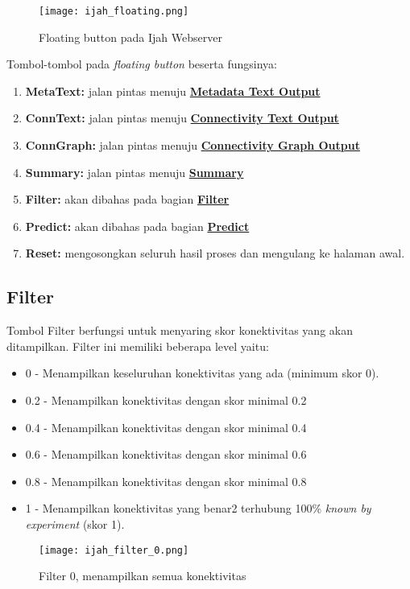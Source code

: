 	\begin{figure}[H]
	\centering
	\texttt{[image: ijah\_floating.png]}
	\caption{Floating button pada Ijah Webserver}
	\label{fig:ijah_floating}
	\end{figure}

Tombol-tombol pada \emph{floating button} beserta fungsinya:
\begin{enumerate}
\item \textbf{MetaText:} jalan pintas menuju \hyperref[meta]{\textbf{Metadata Text Output}}
\item \textbf{ConnText:} jalan pintas menuju \hyperref[text]{\textbf{Connectivity Text Output}}
\item \textbf{ConnGraph:} jalan pintas menuju \hyperref[graph]{\textbf{Connectivity Graph Output}}
\item \textbf{Summary:} jalan pintas menuju \hyperref[summary]{\textbf{Summary}}
\item \textbf{Filter:} akan dibahas pada bagian \hyperref[filter]{\textbf{Filter}}
\item \textbf{Predict:} akan dibahas pada bagian \hyperref[predictmore]{\textbf{Predict}}
\item \textbf{Reset:} mengosongkan seluruh hasil proses dan mengulang ke halaman awal.
\end{enumerate}

	\subsection{Filter} \label{filter}
	Tombol Filter berfungsi untuk menyaring skor konektivitas yang akan ditampilkan. Filter ini memiliki beberapa level yaitu:
	\begin{itemize}
	\item 0 - Menampilkan keseluruhan konektivitas yang ada (minimum skor 0).
	\item 0.2 - Menampilkan konektivitas dengan skor minimal 0.2
	\item 0.4 - Menampilkan konektivitas dengan skor minimal 0.4
	\item 0.6 - Menampilkan konektivitas dengan skor minimal 0.6
	\item 0.8 - Menampilkan konektivitas dengan skor minimal 0.8
	\item 1 - Menampilkan konektivitas yang benar2 terhubung 100\% \emph{known by experiment} (skor 1).
	\end{itemize}

	\begin{figure}[H]
	\centering
	\texttt{[image: ijah\_filter\_0.png]}
	\caption{Filter 0, menampilkan semua konektivitas}
	\label{fig:ijah_filter_0}
	\end{figure}


